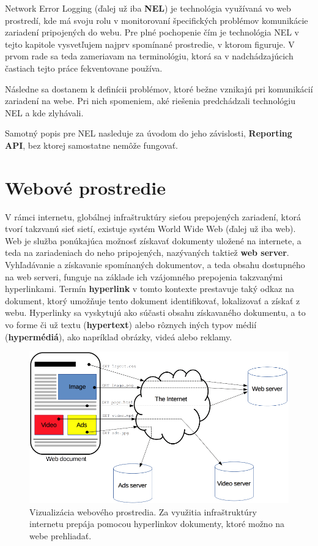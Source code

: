 Network Error Logging (ďalej už iba \textbf{NEL}) je technológia využívaná vo web prostredí, 
kde má svoju rolu v monitorovaní špecifických problémov komunikácie zariadení pripojených do webu.
Pre plné pochopenie čím je technológia NEL v tejto kapitole vysvetľujem najprv 
spomínané prostredie, v ktorom figuruje. 
V prvom rade sa teda zameriavam na terminológiu, ktorá sa v nadchádzajúcich častiach tejto práce fekventovane používa. 

Následne sa dostanem k definícii problémov, ktoré bežne vznikajú pri komunikácií
zariadení na webe.
Pri nich spomeniem, aké riešenia predchádzali technológiu NEL a kde zlyhávali.

Samotný popis pre NEL nasleduje za úvodom do jeho závislosti, \textbf{Reporting API}, bez ktorej samostatne nemôže fungovať.

\section{Webové prostredie}

V rámci internetu, globálnej infraštruktúry sieťou prepojených zariadení, ktorá tvorí takzvanú sieť sietí, existuje systém World Wide Web (ďalej už iba web).
Web je služba ponúkajúca možnosť získavať dokumenty uložené na internete, a teda na zariadeniach do neho pripojených, nazývaných taktiež \textbf{web server}. 
Vyhľadávanie a získavanie spomínaných dokumentov, a teda obsahu dostupného na web serveri, funguje na základe ich vzájomného prepojenia takzvanými hyperlinkami.
Termín \textbf{hyperlink} v tomto kontexte prestavuje taký odkaz na dokument, ktorý umožňuje tento dokument identifikovať, lokalizovať a získať z webu. 
Hyperlinky sa vyskytujú ako súčasti obsahu získavaného dokumentu, a to vo forme či už textu (\textbf{hypertext}) alebo rôznych iných typov médií (\textbf{hypermédiá}), ako napríklad obrázky, videá alebo reklamy. 


\begin{figure}[htb]
\begin{center}
 \includegraphics[scale=0.55]{obrazky-figures/fetching_a_page.png}
 \caption{\centering Vizualizácia webového prostredia. Za využitia infraštruktúry internetu prepája pomocou hyperlinkov dokumenty, ktoré možno na webe prehliadať.}
 \label{img:fetching-a-page}
\end{center}
\end{figure}

